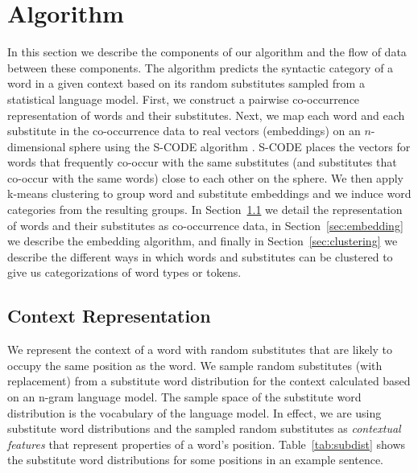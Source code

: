 \section{Algorithm}

In this section we describe the components of our algorithm and the
flow of data between these components.  The algorithm predicts the
syntactic category of a word in a given context based on its random
substitutes sampled from a statistical language model.  First, we
construct a pairwise co-occurrence representation of words and their
substitutes.  Next, we map each word and each substitute in the
co-occurrence data to real vectors (embeddings) on an $n$-dimensional
sphere using the S-CODE algorithm \cite{maron2010sphere}.  S-CODE
places the vectors for words that frequently co-occur with the same
substitutes (and substitutes that co-occur with the same words) close
to each other on the sphere.  We then apply k-means clustering to
group word and substitute embeddings and we induce word categories
from the resulting groups.  In Section~\ref{sec:cooc} we detail the
representation of words and their substitutes as co-occurrence data,
in Section~\ref{sec:embedding} we describe the embedding algorithm,
and finally in Section~\ref{sec:clustering} we describe the different
ways in which words and substitutes can be clustered to give us
categorizations of word types or tokens.


\subsection{Context Representation}
\label{sec:cooc}

We represent the context of a word with random substitutes that are
likely to occupy the same position as the word.  We sample random
substitutes (with replacement) from a substitute word distribution for
the context calculated based on an n-gram language model.  The sample
space of the substitute word distribution is the vocabulary of the
language model.
In effect, we are using
substitute word distributions and the sampled random substitutes as
{\em contextual features} that represent properties of a word's
position.  Table~\ref{tab:subdist} shows the substitute word
distributions for some positions in an example sentence.

